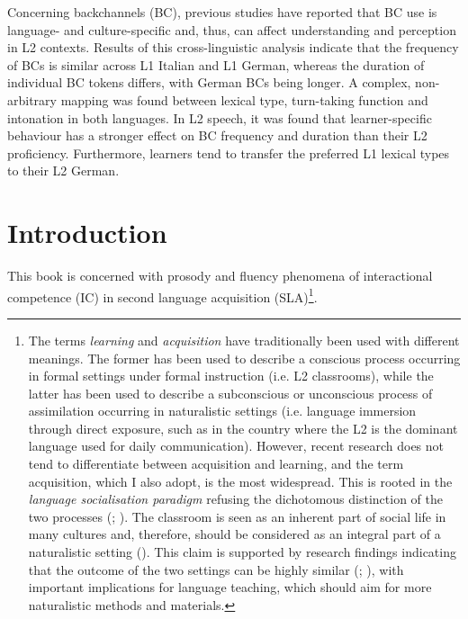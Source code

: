 \begin{stylelsAbstract}
Concerning backchannels (BC), previous studies have reported that BC use is language- and culture-specific and, thus, can affect understanding and perception in L2 contexts. Results of this cross-linguistic analysis indicate that the frequency of BCs is similar across L1 Italian and L1 German, whereas the duration of individual BC tokens differs, with German BCs being longer. A complex, non-arbitrary mapping was found between lexical type, turn-taking function and intonation in both languages. In L2 speech, it was found that learner-specific behaviour has a stronger effect on BC frequency and duration than their L2 proficiency. Furthermore, learners tend to transfer the preferred L1 lexical types to their L2 German.
\end{stylelsAbstract}

\setcounter{tocdepth}{5}
\renewcommand\contentsname{Contents}
\tableofcontents

\section{Introduction}
\hypertarget{Toc191305872}{}
This book is concerned with prosody and fluency phenomena of interactional competence (IC) in second language acquisition (SLA)\footnote{The terms \textit{learning} and \textit{acquisition} have traditionally been used with different meanings. The former has been used to describe a conscious process occurring in formal settings under formal instruction (i.e. L2 classrooms), while the latter has been used to describe a subconscious or unconscious process of assimilation occurring in naturalistic settings (i.e. language immersion through direct exposure, such as in the country where the L2 is the dominant language used for daily communication). However, recent research does not tend to differentiate between acquisition and learning, and the term acquisition, which I also adopt, is the most widespread. This is rooted in the \textit{language socialisation paradigm} \citep{Watson-Gegeo2004} refusing the dichotomous distinction of the two processes (\citealt{BaraschJames1994}; \citealt{Ellis1989}). The classroom is seen as an inherent part of social life in many cultures and, therefore, should be considered as an integral part of a naturalistic setting (\citealt{Watson-GegeoNielsen2003}). This claim is supported by research findings indicating that the outcome of the two settings can be highly similar (\citealt{Rivers1994}; \citealt{Willett1995}), with important implications for language teaching, which should aim for more naturalistic methods and materials.}. 

